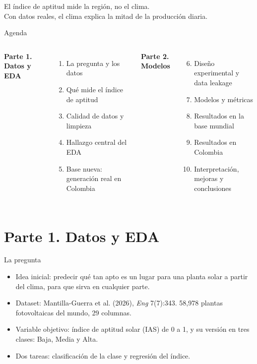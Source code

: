 \documentclass[aspectratio=169,10pt]{beamer}
\begin{document}
\begin{frame}[standout]
  El índice de aptitud mide la \alert{región}, no el clima.\\[0.8em]
  {\normalsize Con datos reales, el clima explica la mitad de la producción diaria.}
\end{frame}

\begin{frame}{Agenda}
  \begin{columns}[T]
    \textbf{Parte 1. Datos y EDA}
    \begin{enumerate}
      \item La pregunta y los datos
      \item Qué mide el índice de aptitud
      \item Calidad de datos y limpieza
      \item Hallazgo central del EDA
      \item Base nueva: generación real en Colombia
    \end{enumerate}
    \textbf{Parte 2. Modelos}
    \begin{enumerate}
      \setcounter{enumi}{5}
      \item Diseño experimental y data leakage
      \item Modelos y métricas
      \item Resultados en la base mundial
      \item Resultados en Colombia
      \item Interpretación, mejoras y conclusiones
    \end{enumerate}
  \end{columns}
\end{frame}

\section{Parte 1. Datos y EDA}

\begin{frame}{La pregunta}
  \begin{itemize}
    \item Idea inicial: predecir qué tan apto es un lugar para una planta solar \alert{a partir del clima}, para que sirva en cualquier parte.
    \item Dataset: Mantilla-Guerra et al. (2026), \textit{Eng} 7(7):343.
          58,978 plantas fotovoltaicas del mundo, 29 columnas.
    \item Variable objetivo: índice de aptitud solar (IAS) de 0 a 1, y su versión en tres clases: Baja, Media y Alta.
    \item Dos tareas: clasificación de la clase y regresión del índice.
  \end{itemize}
\end{frame}
\end{document}
